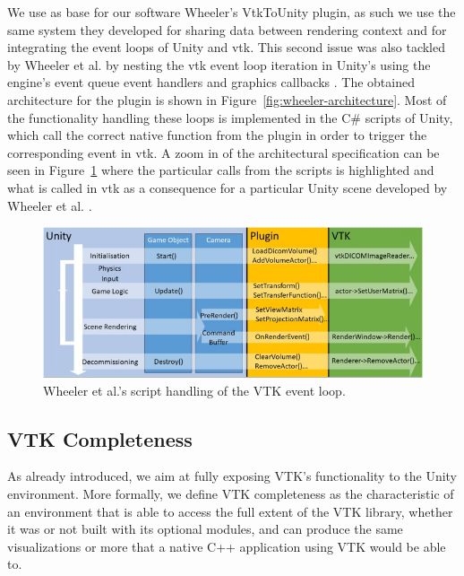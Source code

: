 We use as base for our software Wheeler's VtkToUnity plugin, as such we use the same system they developed for sharing data between rendering context and for integrating the event loops of Unity and \acrshort{vtk}. This second issue was also tackled by Wheeler et al. by nesting the \acrshort{vtk} event loop iteration in Unity's using the engine's event queue event handlers and graphics callbacks \cite{wheeler_virtual_2018}. The obtained architecture for the plugin is shown in Figure~\ref{fig:wheeler-architecture}. Most of the functionality handling these loops is implemented in the C\# scripts of Unity, which call the correct native function from the plugin in order to trigger the corresponding event in \acrshort{vtk}. A zoom in of the architectural specification can be seen in Figure~\ref{fig:wheeler-architecture-zoomin} where the particular calls from the scripts is highlighted and what is called in \acrshort{vtk} as a consequence for a particular Unity scene developed by Wheeler et al. \cite{wheeler_virtual_2018}.

\begin{figure}[t]
    \centering
    \includegraphics[width=\textwidth]{pictures/wheeler_architecture_zoomin.jpg}
    \caption{Wheeler et al.'s script handling of the VTK event loop.}
    \label{fig:wheeler-architecture-zoomin}
\end{figure}

\subsection{VTK Completeness}

As already introduced, we aim at fully exposing VTK's functionality to the Unity environment. More formally, we define VTK completeness as the characteristic of an environment that is able to access the full extent of the VTK library, whether it was or not built with its optional modules, and can produce the same visualizations or more that a native C++ application using VTK would be able to. 

